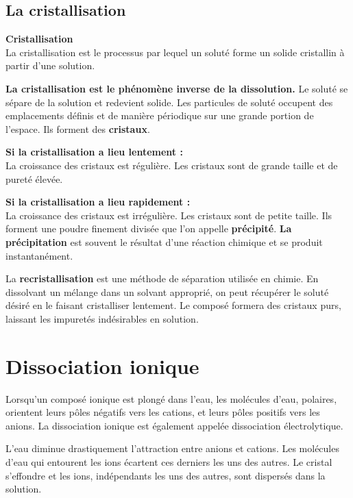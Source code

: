 \documentclass[
  11pt,
  a4paper,
  openany]{book}
\begin{document}
\subsection{La cristallisation}\label{la-cristallisation}

\begin{tcolorbox}
\textbf{Cristallisation}\\
La cristallisation est le processus par lequel un soluté forme un solide cristallin à partir d'une solution.

\end{tcolorbox}

\textbf{La cristallisation est le phénomène inverse de la dissolution.} Le soluté se sépare de la solution et redevient solide. Les particules de soluté occupent des emplacements définis et de manière périodique sur une grande portion de l'espace. Ils forment des \textbf{cristaux}.

\textbf{Si la cristallisation a lieu lentement :}\\
La croissance des cristaux est régulière. Les cristaux sont de grande taille et de pureté élevée.

\textbf{Si la cristallisation a lieu rapidement :}\\
La croissance des cristaux est irrégulière. Les cristaux sont de petite taille. Ils forment une poudre finement divisée que l'on appelle \textbf{précipité}. \textbf{La précipitation} est souvent le résultat d'une réaction chimique et se produit instantanément.

La \textbf{recristallisation} est une méthode de séparation utilisée en chimie. En dissolvant un mélange dans un solvant approprié, on peut récupérer le soluté désiré en le faisant cristalliser lentement. Le composé formera des cristaux purs, laissant les impuretés indésirables en solution.

\section{Dissociation ionique}\label{dissociation-ionique}

Lorsqu'un composé ionique est plongé dans l'eau, les molécules d'eau, polaires, orientent leurs pôles négatifs vers les cations, et leurs pôles positifs vers les anions. La dissociation ionique est également appelée dissociation électrolytique.

L'eau diminue drastiquement l'attraction entre anions et cations. Les molécules d'eau qui entourent les ions écartent ces derniers les uns des autres. Le cristal s'effondre et les ions, indépendants les uns des autres, sont dispersés dans la solution.
\end{document}
